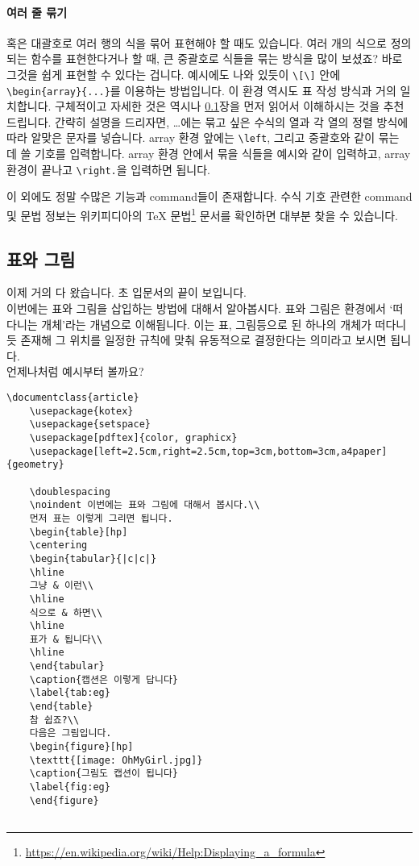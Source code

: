 \paragraph{여러 줄 묶기}
혹은 대괄호로 여러 행의 식을 묶어 표현해야 할 때도 있습니다.
여러 개의 식으로 정의되는 함수를 표현한다거나 할 때, 큰 중괄호로 식들을 묶는 방식을 많이 보셨죠?
바로 그것을 쉽게 표현할 수 있다는 겁니다.
예시에도 나와 있듯이 \verb|\[\]| 안에 \verb|\begin{array}{...}|를 이용하는 방법입니다.
이 환경 역시도 표 작성 방식과 거의 일치합니다.
구체적이고 자세한 것은 역시나 \ref{subsec:tabfig}장을 먼저 읽어서 이해하시는 것을 추천드립니다.
간략히 설명을 드리자면, \dots 에는 묶고 싶은 수식의 열과 각 열의 정렬 방식에 따라 알맞은 문자를 넣습니다.
array 환경 앞에는 \verb|\left|, 그리고 중괄호와 같이 묶는 데 쓸 기호를 입력합니다.
array 환경 안에서 묶을 식들을 예시와 같이 입력하고, array 환경이 끝나고 \verb|\right.|을 입력하면 됩니다.

이 외에도 정말 수많은 기능과 command들이 존재합니다.
수식 기호 관련한 command 및 문법 정보는 위키피디아의 TeX 문법\footnote{\url{https://en.wikipedia.org/wiki/Help:Displaying_a_formula}} 문서를 확인하면 대부분 찾을 수 있습니다.

\newpage
\subsection{표와 그림}
\label{subsec:tabfig}
이제 거의 다 왔습니다. 초 입문서의 끝이 보입니다.\\
이번에는 표와 그림을 삽입하는 방법에 대해서 알아봅시다.
표와 그림은 \lt 환경에서 `떠다니는 개체'라는 개념으로 이해됩니다.
이는 표, 그림등으로 된 하나의 개체가 떠다니듯 존재해 그 위치를 일정한 규칙에 맞춰 유동적으로 결정한다는 의미라고 보시면 됩니다.\\
언제나처럼 예시부터 볼까요?

\begin{Verbatim}[frame=single]
	\documentclass{article}
	\usepackage{kotex}
	\usepackage{setspace}
	\usepackage[pdftex]{color, graphicx}
	\usepackage[left=2.5cm,right=2.5cm,top=3cm,bottom=3cm,a4paper]{geometry}
	
	\doublespacing
	\noindent 이번에는 표와 그림에 대해서 봅시다.\\
	먼저 표는 이렇게 그리면 됩니다.
	\begin{table}[hp]
	\centering
	\begin{tabular}{|c|c|}
	\hline
	그냥 & 이런\\
	\hline
	식으로 & 하면\\
	\hline
	표가 & 됩니다\\
	\hline
	\end{tabular}
	\caption{캡션은 이렇게 답니다}
	\label{tab:eg}
	\end{table}
	참 쉽죠?\\
	다음은 그림입니다.
	\begin{figure}[hp]
	\texttt{[image: OhMyGirl.jpg]}
	\caption{그림도 캡션이 됩니다}
	\label{fig:eg}
	\end{figure}
	
\end{Verbatim}

